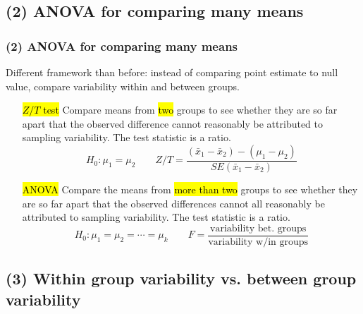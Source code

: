 \documentclass[11pt,containsverbatim,handout]{beamer}
\begin{document}

\subsection{(2) ANOVA for comparing many means}


\begin{frame}
\frametitle{(2) ANOVA for comparing many means}

Different framework than before: instead of comparing point estimate to null value, compare variability within and between groups.

\pause

\begin{itemize}
\item[\hl{$Z$/$T$ test}] Compare means from \hl{two} groups to see whether they are so far apart that the observed difference cannot reasonably be attributed to sampling variability. The test statistic is a ratio.
\[ H_0: \mu_1 = \mu_2 \qquad
Z / T = \frac{(\bar{x}_1 - \bar{x}_2) - (\mu_1 - \mu_2)}{SE(\bar{x}_1 - \bar{x}_2)} \]

\pause

\item[\hl{ANOVA}] Compare the means from \hl{more than two} groups to see whether they are so far apart that the observed differences cannot all reasonably be attributed to sampling variability. The test statistic is a ratio.
\[ H_0: \mu_1 = \mu_2 = \cdots = \mu_k \qquad F = \frac{\text{variability bet. groups}}{\text{variability w/in groups}} \]
\end{itemize}

\end{frame}


\subsection{(3) Within group variability vs. between group variability} 

\end{document}
